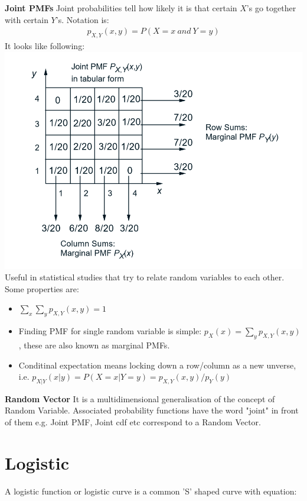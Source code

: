 \documentclass[10pt,a4paper]{article}
\begin{document}
	\begin{defn}{\textbf{Joint PMFs}}
		Joint probabilities tell how likely it is that certain $X$'s go together with certain $Y$'s. Notation is: \\
		\begin{align}
			p_{X,Y}(x,y) = P(X = x\ and\ Y = y)
		\end{align}
		It looks like following:
		\includegraphics{jointpmf}
		Useful in statistical studies that try to relate
		random variables to each other.
		Some properties are: \\
		\begin{itemize}
			\item $\sum_{x} \sum_{y} p_{X,Y}(x,y) = 1$
			\item Finding PMF for single random variable is simple: $p_X(x) = \sum_{y} p_{X,Y}(x,y)$, these are also known as marginal PMFs.
			\item Conditinal expectation means locking down a row/column as a new unverse, i.e. $p_{X|Y}(x|y) = P(X=x | Y=y) = p_{X,Y}(x,y)/p_Y(y)$
		\end{itemize}
	\end{defn}

	\begin{defn}{\textbf{Random Vector}}
	It is a multidimensional generalisation of the concept of Random Variable. Associated probability functions have the word "joint" in front of them e.g. Joint PMF, Joint cdf etc correspond to a Random Vector.
	\end{defn}

	\section{Logistic}	
	A logistic function or logistic curve is a common 'S' shaped curve with equation:
	
\end{document}
